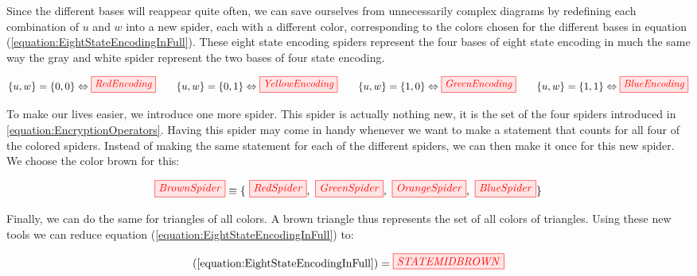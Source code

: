 \documentclass[]{article}
\begin{document}
Since the different bases will reappear quite often, we can save ourselves from unnecessarily complex diagrams by redefining each combination of $u$ and $w$ into a new spider, each with a different color, corresponding to the colors chosen for the different bases in equation (\ref{equation:EightStateEncodingInFull}). These eight state encoding spiders represent the four bases of eight state encoding in much the same way the gray and white spider represent the two bases of four state encoding.


\begin{equation}
	\label{equation:EncryptionOperators}
	\{u,w\} = \{0, 0\} \Leftrightarrow \tikzfig{RedEncoding} ~~~~~~ \{u,w\} = \{0, 1\} \Leftrightarrow \tikzfig{YellowEncoding}~~~~~~ \{u,w\} = \{1, 0\} \Leftrightarrow \tikzfig{GreenEncoding}~~~~~~ \{u,w\} = \{1, 1\} \Leftrightarrow \tikzfig{BlueEncoding}
\end{equation}

To make our lives easier, we introduce one more spider. This spider is actually nothing new, it is the set of the four spiders introduced in \ref{equation:EncryptionOperators}. Having this spider may come in handy whenever we want to make a statement that counts for all four of the colored spiders. Instead of making the same statement for each of the different spiders, we can then make it once for this new spider. We choose the color brown for this:

\begin{equation}
\label{equation:brownspiderset}
\tikzfig{BrownSpider} \equiv \{~\tikzfig{RedSpider},~ \tikzfig{GreenSpider},~ \tikzfig{OrangeSpider},~ \tikzfig{BlueSpider}\}
\end{equation}

Finally, we can do the same for triangles of all colors. A brown triangle thus represents the set of all colors of triangles. Using these new tools we can reduce equation (\ref{equation:EightStateEncodingInFull}) to:

\begin{equation}
\label{equation:EightStateEncodingInFullBrown}
(\ref{equation:EightStateEncodingInFull}) = \tikzfig{STATEMIDBROWN}
\end{equation}
\end{document}
